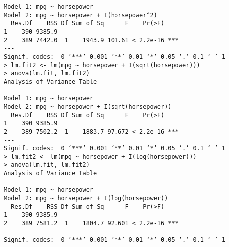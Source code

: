 \begin{itemize}
\begin{verbatim}
Model 1: mpg ~ horsepower
Model 2: mpg ~ horsepower + I(horsepower^2)
  Res.Df    RSS Df Sum of Sq      F    Pr(>F)    
1    390 9385.9                                  
2    389 7442.0  1    1943.9 101.61 < 2.2e-16 ***
---
Signif. codes:  0 ‘***’ 0.001 ‘**’ 0.01 ‘*’ 0.05 ‘.’ 0.1 ‘ ’ 1
> lm.fit2 <- lm(mpg ~ horsepower + I(sqrt(horsepower)))
> anova(lm.fit, lm.fit2)
Analysis of Variance Table

Model 1: mpg ~ horsepower
Model 2: mpg ~ horsepower + I(sqrt(horsepower))
  Res.Df    RSS Df Sum of Sq      F    Pr(>F)    
1    390 9385.9                                  
2    389 7502.2  1    1883.7 97.672 < 2.2e-16 ***
---
Signif. codes:  0 ‘***’ 0.001 ‘**’ 0.01 ‘*’ 0.05 ‘.’ 0.1 ‘ ’ 1
> lm.fit2 <- lm(mpg ~ horsepower + I(log(horsepower)))
> anova(lm.fit, lm.fit2)
Analysis of Variance Table

Model 1: mpg ~ horsepower
Model 2: mpg ~ horsepower + I(log(horsepower))
  Res.Df    RSS Df Sum of Sq      F    Pr(>F)    
1    390 9385.9                                  
2    389 7581.2  1    1804.7 92.601 < 2.2e-16 ***
---
Signif. codes:  0 ‘***’ 0.001 ‘**’ 0.01 ‘*’ 0.05 ‘.’ 0.1 ‘ ’ 1
        \end{verbatim}\normalsize
\end{itemize}
